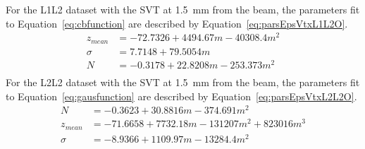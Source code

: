 For the L1L2 dataset with the SVT at 1.5~mm from the beam, the parameters fit to Equation~\eqref{eq:cbfunction} are described by Equation~\eqref{eq:parsEpsVtxL1L2O}.
\begin{equation}
\begin{split}
\label{eq:parsEpsVtxL1L2O}
z_{mean} &= -72.7326+4494.67m-40308.4m^2\\
\sigma &= 7.7148+79.5054m\\
N &= -0.3178+22.8208m-253.373m^2 \\
\end{split}
\end{equation}
For the L2L2 dataset with the SVT at 1.5~mm from the beam, the parameters fit to Equation~\eqref{eq:gausfunction} are described by Equation~\eqref{eq:parsEpsVtxL2L2O}.
\begin{equation}
\begin{split}
\label{eq:parsEpsVtxL2L2O}
N &= -0.3623+30.8816m-374.691m^2\\
z_{mean} &= -71.6658+7732.18m-131207m^2+823016m^3\\
\sigma &= -8.9366+1109.97m-13284.4m^2\\
\end{split}
\end{equation}